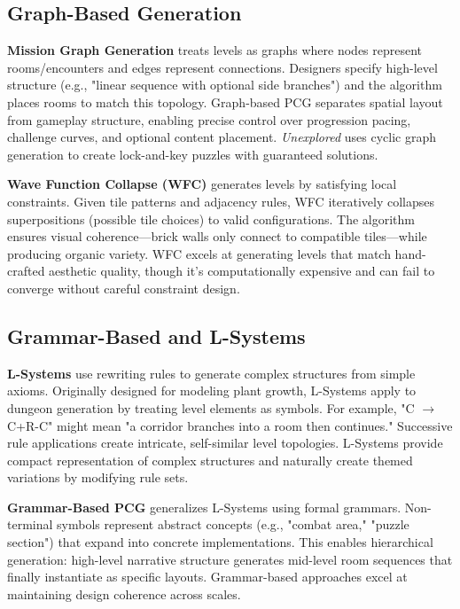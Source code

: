 \documentclass[11pt]{article}
\begin{document}
\subsection{Graph-Based Generation}

\textbf{Mission Graph Generation} treats levels as graphs where nodes represent rooms/encounters and edges represent connections. Designers specify high-level structure (e.g., "linear sequence with optional side branches") and the algorithm places rooms to match this topology. Graph-based PCG separates spatial layout from gameplay structure, enabling precise control over progression pacing, challenge curves, and optional content placement. \textit{Unexplored} uses cyclic graph generation to create lock-and-key puzzles with guaranteed solutions.

\textbf{Wave Function Collapse (WFC)} generates levels by satisfying local constraints. Given tile patterns and adjacency rules, WFC iteratively collapses superpositions (possible tile choices) to valid configurations. The algorithm ensures visual coherence—brick walls only connect to compatible tiles—while producing organic variety. WFC excels at generating levels that match hand-crafted aesthetic quality, though it's computationally expensive and can fail to converge without careful constraint design.

\subsection{Grammar-Based and L-Systems}

\textbf{L-Systems} use rewriting rules to generate complex structures from simple axioms. Originally designed for modeling plant growth, L-Systems apply to dungeon generation by treating level elements as symbols. For example, "C $\rightarrow$ C+R-C" might mean "a corridor branches into a room then continues." Successive rule applications create intricate, self-similar level topologies. L-Systems provide compact representation of complex structures and naturally create themed variations by modifying rule sets.

\textbf{Grammar-Based PCG} generalizes L-Systems using formal grammars. Non-terminal symbols represent abstract concepts (e.g., "combat area," "puzzle section") that expand into concrete implementations. This enables hierarchical generation: high-level narrative structure generates mid-level room sequences that finally instantiate as specific layouts. Grammar-based approaches excel at maintaining design coherence across scales.
\end{document}
